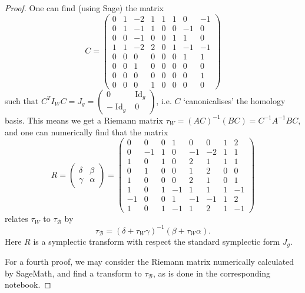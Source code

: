 \documentclass{amsart}
\DeclareMathOperator{\id}{Id}
\begin{document}
\begin{proof}
One can find (using Sage) the matrix 
\[
C = \begin{pmatrix}
0 & 1 & -2 & 1 & 1 & 1 & 0 & -1 \\ 0 & 1 & -1 & 1 & 0 & 0 & -1 & 0 \\ 0 & 0 & -1 & 0 & 0 & 1 & 1 & 0 \\ 1 & 1 & -2 & 2 & 0 & 1 & -1 & -1 \\ 0 & 0 & 0 & 0 & 0 & 0 & 1 & 1 \\ 0 & 0 & 1 & 0 & 0 & 0 & 0 & 0 \\ 0 & 0 & 0 & 0 & 0 & 0 & 0 & 1 \\ 0 & 0 & 0 & 1 & 0 & 0 & 0 & 0
\end{pmatrix}
\]
such that $C^T I_W C = J_g = \begin{pmatrix} 0 & \id_g \\ -\id_g & 0 \end{pmatrix}$, i.e. $C$ `canonicalises' the homology basis. This means we get a Riemann matrix $\tau_W = (AC)^{-1} (BC) = C^{-1}A^{-1} B C$, and one can numerically find that the matrix 
\[
R = \begin{pmatrix} \delta & \beta \\ \gamma & \alpha \end{pmatrix} = \begin{pmatrix}
0 & 0 & 0 & 1 & 0 & 0 & 1 & 2 \\ 0 & -1 & 1 & 0 & -1 & -2 & 1 & 1 \\ 1 & 0 & 1 & 0 & 2 & 1 & 1 & 1 \\ 0 & 1 & 0 & 0 & 1 & 2 & 0 & 0 \\ 1 & 0 & 0 & 0 & 2 & 1 & 0 & 1 \\ 1 & 0 & 1 & -1 & 1 & 1 & 1 & -1 \\ -1 & 0 & 0 & 1 & -1 & -1 & 1 & 2 \\ 1 & 0 & 1 & -1 & 1 & 2 & 1 & -1
\end{pmatrix}
\]
relates $\tau_W$ to $\tau_{\mathcal{B}}$ by 
\begin{equation}\label{transRRW}
   \tau_{\mathcal{B}} = (\delta + \tau_W \gamma)^{-1}(\beta+ \tau_W \alpha) .
\end{equation}
Here $R$ is a symplectic transform with respect the standard symplectic form $J_g$. 

For a fourth proof, we may consider the Riemann matrix numerically calculated by SageMath, and find a transform to $\tau_{\mathcal{B}}$, as is done in the corresponding notebook. 
\end{proof}
\end{document}
